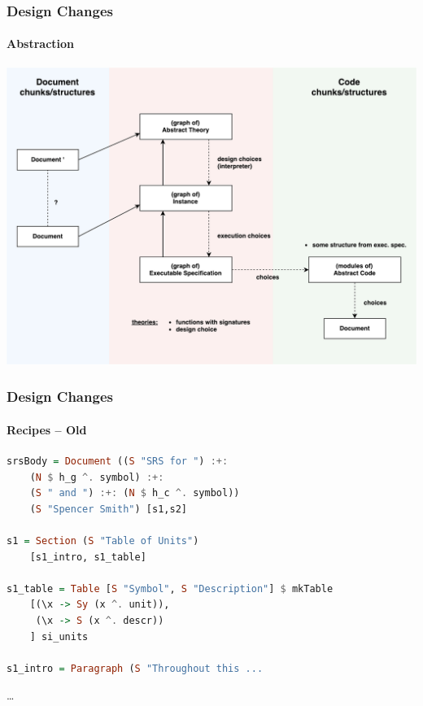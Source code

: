 \documentclass{beamer}
\begin{document}
\begin{frame}

\frametitle{Design Changes}
\framesubtitle{Abstraction}

\begin{center}
\includegraphics[width=\textwidth]{new_design2.pdf}
\end{center}

\end{frame}


\begin{frame}[fragile]

\frametitle{Design Changes}
\framesubtitle{Recipes -- Old}

\begin{lstlisting}[language=Haskell, frame=single, showstringspaces=false, basicstyle=\scriptsize]
srsBody = Document ((S "SRS for ") :+: 
    (N $ h_g ^. symbol) :+: 
    (S " and ") :+: (N $ h_c ^. symbol)) 
    (S "Spencer Smith") [s1,s2]

s1 = Section (S "Table of Units") 
    [s1_intro, s1_table]

s1_table = Table [S "Symbol", S "Description"] $ mkTable
    [(\x -> Sy (x ^. unit)),
     (\x -> S (x ^. descr))
    ] si_units

s1_intro = Paragraph (S "Throughout this ...
\end{lstlisting} 
\large{\ldots}

\end{frame}

\end{document}
